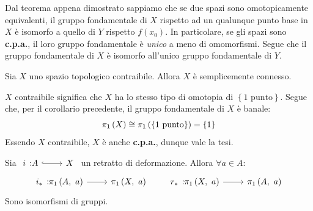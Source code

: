 \begin{demonstration}
	Dal teorema appena dimostrato sappiamo che se due spazi sono omotopicamente equivalenti, il gruppo fondamentale di $X$ rispetto ad un qualunque punto base in $X$ è isomorfo a quello di $Y$ rispetto $f\left(x_0\right)$. In particolare, se gli spazi sono \textbf{c.p.a.}, il loro gruppo fondamentale è \textit{unico} a meno di omomorfismi. Segue che il gruppo fondamentale di $X$ è isomorfo all'unico gruppo fondamentale di $Y$.
\end{demonstration}
\begin{corollary}
	Sia $X$ uno spazio topologico contraibile. Allora $X$ è semplicemente connesso.
\end{corollary}
\begin{demonstration}
	$X$ contraibile significa che $X$ ha lo stesso tipo di omotopia di $\left\{1\text{ punto}\right\}$. Segue che, per il corollario precedente, il gruppo fondamentale di $X$ è banale:
	\begin{equation*}
		\gruf{X}{\ }\cong\gruf{\left\{1\text{ punto}\right\}}{\ }=\left\{1\right\}
	\end{equation*}
	Essendo $X$ contraibile, $X$ è anche \textbf{c.p.a.}, dunque vale la tesi.
\end{demonstration}
\begin{corollary} \label{inclusione rdd isomorfismo}
	Sia $\incl{i}{A}{X}$ un retratto di deformazione. Allora $\forall a\in A$:
	\begin{equation}
		\funz{i_{\ast}}{\gruf{A}{a}}{\gruf{X}{a}}\qquad\funz{r_{\ast}}{\gruf{X}{a}}{\gruf{A}{a}}
	\end{equation}
Sono isomorfismi di gruppi.
\end{corollary}
